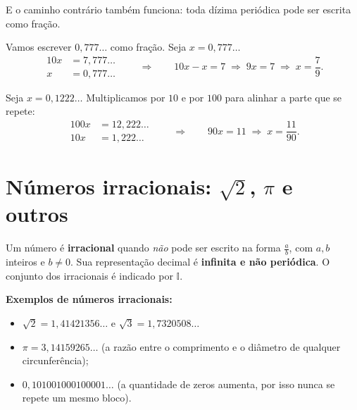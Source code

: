 \documentclass[11pt,a4paper]{article}
\begin{document}
E o caminho contrário também funciona: toda dízima periódica pode ser escrita como fração.

\begin{exemplo}
Vamos escrever $0{,}777\ldots$ como fração. Seja $x = 0{,}777\ldots$
\[
\begin{aligned}
  10x &= 7{,}777\ldots\\
  x   &= 0{,}777\ldots
\end{aligned}
\qquad\Longrightarrow\qquad
10x - x = 7 \;\Longrightarrow\; 9x = 7 \;\Longrightarrow\; x = \frac{7}{9}.
\]
\end{exemplo}

\begin{exemplo}
Seja $x = 0{,}1222\ldots$ Multiplicamos por $10$ e por $100$ para alinhar a parte
que se repete:
\[
\begin{aligned}
  100x &= 12{,}222\ldots\\
   10x &= 1{,}222\ldots
\end{aligned}
\qquad\Longrightarrow\qquad
90x = 11 \;\Longrightarrow\; x = \frac{11}{90}.
\]
\end{exemplo}

\section{Números irracionais: $\sqrt{2}$, $\pi$ e outros}

\begin{definicao}
Um número é \textbf{irracional} quando \emph{não} pode ser escrito na forma
$\frac{a}{b}$, com $a, b$ inteiros e $b \neq 0$. Sua representação decimal é
\textbf{infinita e não periódica}. O conjunto dos irracionais é indicado por
$\mathbb{I}$.
\end{definicao}

\noindent\textbf{Exemplos de números irracionais:}
\begin{itemize}[nosep]
  \item $\sqrt{2} = 1{,}41421356\ldots$ \quad e \quad $\sqrt{3} = 1{,}7320508\ldots$
  \item $\pi = 3{,}14159265\ldots$ (a razão entre o comprimento e o diâmetro de qualquer circunferência);
  \item $0{,}101001000100001\ldots$ (a quantidade de zeros aumenta, por isso nunca se repete um mesmo bloco).
\end{itemize}
\end{document}
